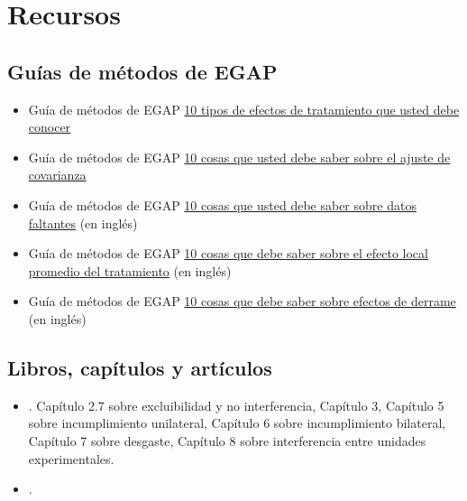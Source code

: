\documentclass[12pt,spanish,]{book}
\begin{document}
\hypertarget{recursos-4}{%
\section{Recursos}\label{recursos-4}}

\hypertarget{guuxedas-de-muxe9todos-de-egap-3}{%
\subsection{Guías de métodos de EGAP}\label{guuxedas-de-muxe9todos-de-egap-3}}

\begin{itemize}
\item
  Guía de métodos de EGAP
  \href{https://egap.org/es/resource/10-tipos-de-efectos-de-tratamiento-que-debe-conocer/}{10 tipos de efectos de tratamiento que usted debe conocer}
\item
  Guía de métodos de EGAP \href{https://egap.org/es/resource/10-cosas-que-debe-saber-sobre-el-ajuste-de-las-covariables/}{10 cosas que usted debe saber sobre el ajuste de covarianza}
\item
  Guía de métodos de EGAP \href{https://egap.org/resource/10-things-to-know-about-missing-data/}{10 cosas que usted debe saber sobre datos faltantes} (en inglés)
\item
  Guía de métodos de EGAP \href{https://egap.org/resource/10-things-to-know-about-the-local-average-treatment-effect/}{10 cosas que debe saber sobre el efecto local promedio del tratamiento} (en inglés)
\item
  Guía de métodos de EGAP \href{https://egap.org/resource/10-things-to-know-about-spillovers/}{10 cosas que debe saber sobre efectos de derrame} (en inglés)
\end{itemize}

\hypertarget{libros-capuxedtulos-y-artuxedculos-3}{%
\subsection{Libros, capítulos y artículos}\label{libros-capuxedtulos-y-artuxedculos-3}}

\begin{itemize}
\item
  \autocite{gerber_field_2012}. Capítulo 2.7 sobre excluibilidad y no interferencia, Capítulo 3, Capítulo 5 sobre incumplimiento unilateral, Capítulo 6 sobre incumplimiento bilateral, Capítulo 7 sobre desgaste, Capítulo 8 sobre interferencia entre unidades experimentales.
\item
  \autocite{bowers2020causality}.
\end{itemize}
\end{document}
